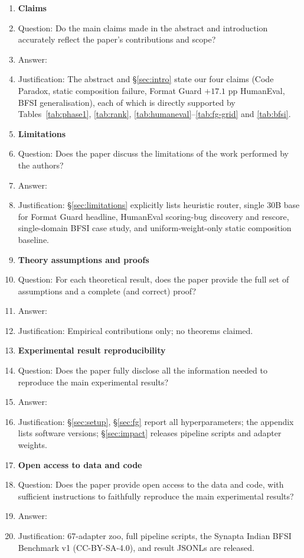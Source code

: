 \documentclass{article}
\begin{document}
\begin{enumerate}

\item {\bf Claims}
    \item[] Question: Do the main claims made in the abstract and introduction accurately reflect the paper's contributions and scope?
    \item[] Answer: \answerYes{}
    \item[] Justification: The abstract and \S\ref{sec:intro} state our four claims (Code Paradox, static composition failure, Format Guard $+17.1$ pp HumanEval, BFSI generalisation), each of which is directly supported by Tables~\ref{tab:phase1}, \ref{tab:rank}, \ref{tab:humaneval}--\ref{tab:fg-grid} and \ref{tab:bfsi}.

\item {\bf Limitations}
    \item[] Question: Does the paper discuss the limitations of the work performed by the authors?
    \item[] Answer: \answerYes{}
    \item[] Justification: \S\ref{sec:limitations} explicitly lists heuristic router, single 30B base for Format Guard headline, HumanEval scoring-bug discovery and rescore, single-domain BFSI case study, and uniform-weight-only static composition baseline.

\item {\bf Theory assumptions and proofs}
    \item[] Question: For each theoretical result, does the paper provide the full set of assumptions and a complete (and correct) proof?
    \item[] Answer: \answerNA{}
    \item[] Justification: Empirical contributions only; no theorems claimed.

\item {\bf Experimental result reproducibility}
    \item[] Question: Does the paper fully disclose all the information needed to reproduce the main experimental results?
    \item[] Answer: \answerYes{}
    \item[] Justification: \S\ref{sec:setup}, \S\ref{sec:fg} report all hyperparameters; the appendix lists software versions; \S\ref{sec:impact} releases pipeline scripts and adapter weights.

\item {\bf Open access to data and code}
    \item[] Question: Does the paper provide open access to the data and code, with sufficient instructions to faithfully reproduce the main experimental results?
    \item[] Answer: \answerYes{}
    \item[] Justification: 67-adapter zoo, full pipeline scripts, the Synapta Indian BFSI Benchmark v1 (CC-BY-SA-4.0), and result JSONLs are released.


\end{enumerate}
\end{document}
